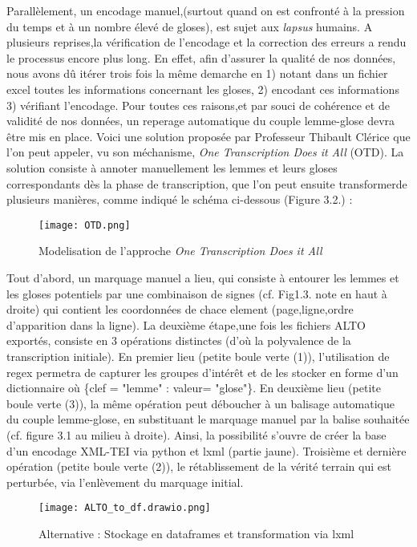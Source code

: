 \documentclass[a4paper, twoside, 12pt]{book}
\begin{document}
Parallèlement, un encodage manuel,(surtout quand on est confronté à la pression du temps et à un nombre élevé de gloses), est sujet aux \textit{lapsus} humains. A plusieurs reprises,la vérification de l'encodage et la correction des erreurs a rendu le processus encore plus long. En effet, afin d'assurer la qualité de nos données, nous avons dû itérer trois fois la même demarche en 1) notant dans un fichier excel toutes les informations concernant les gloses, 2) encodant ces informations 3) vérifiant l'encodage. Pour toutes ces raisons,et par souci de cohérence et de validité de nos données, un reperage automatique du couple lemme-glose devra être mis en place. Voici une solution proposée par Professeur Thibault Clérice que l'on peut appeler, vu son méchanisme, \textit{One Transcription Does it All} (OTD). La solution consiste à annoter manuellement les lemmes et leurs gloses correspondants dès la phase de transcription, que l'on peut ensuite transformerde plusieurs manières, comme indiqué le schéma ci-dessous (Figure 3.2.) : 

\begin{figure}[H]
    \centering
    \texttt{[image: OTD.png]}
    \caption{Modelisation de l'approche \textit{One Transcription Does it All}}
\end{figure}

Tout d'abord, un marquage manuel a lieu, qui consiste à entourer les lemmes et les gloses potentiels par une combinaison de signes (cf. Fig1.3. note en haut à droite) qui contient les coordonnées de chace element (page,ligne,ordre d'apparition dans la ligne). La deuxième étape,une fois les fichiers ALTO exportés, consiste en 3 opérations distinctes (d'où la polyvalence de la transcription initiale). En premier lieu (petite boule verte (1)), l'utilisation de regex permetra de capturer les groupes d'intérêt et de les stocker en forme d'un dictionnaire où \{clef = "lemme" : valeur= "glose"\}. En deuxième lieu (petite boule verte (3)), la même opération peut déboucher à un balisage automatique du couple lemme-glose, en substituant le marquage manuel par la balise souhaitée (cf. figure 3.1 au milieu à droite). Ainsi, la possibilité s'ouvre de créer la base d'un encodage XML-TEI via python et lxml (partie jaune). Troisième et dernière opération (petite boule verte (2)), le rétablissement de la vérité terrain qui est perturbée, via l'enlèvement du marquage initial. 

\begin{figure}[H]
    \centering
    \texttt{[image: ALTO\_to\_df.drawio.png]}
    \caption{Alternative : Stockage en dataframes et transformation via lxml }
\end{figure}
\end{document}
